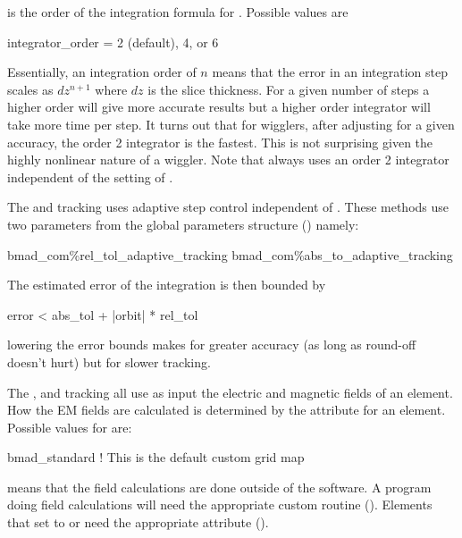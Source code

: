  is the order of the integration formula for 
. Possible values are
\begin{example}
  integrator_order = 2 (default), 4, or 6
\end{example}
Essentially, an integration order of $n$ means that the error in an
integration step scales as $dz^{n+1}$ where $dz$ is the slice
thickness.  For a given number of steps a higher order will give more
accurate results but a higher order integrator will take more time per
step. It turns out that for wigglers, after adjusting 
for a given accuracy, the order 2 integrator is the fastest. This is
not surprising given the highly nonlinear nature of a wiggler. Note
that  always uses an order 2 integrator
independent of the setting of .

The  and  tracking uses adaptive step
control independent of . These methods use two parameters
from the \bmad global parameters structure () namely:
\begin{example}
  bmad_com\%rel_tol_adaptive_tracking
  bmad_com\%abs_to_adaptive_tracking
\end{example}
The estimated error of the integration is then bounded by
\begin{example}
  error < abs_tol + |orbit| * rel_tol
\end{example}
lowering the error bounds makes for greater accuracy (as long as round-off 
doesn't hurt) but for slower tracking. 

The , and  tracking all use
as input the electric and magnetic fields of an element. How the EM fields
are calculated is determined by the  attribute for an element.
Possible values for  are:
\begin{example}
  bmad_standard     ! This is the default
  custom
  grid
  map  
\end{example}
 means that the field calculations are done outside of the
\bmad software. A program doing  field calculations will
need the appropriate custom routine (). Elements
that set  to  or  need the appropriate
 attribute ().  

